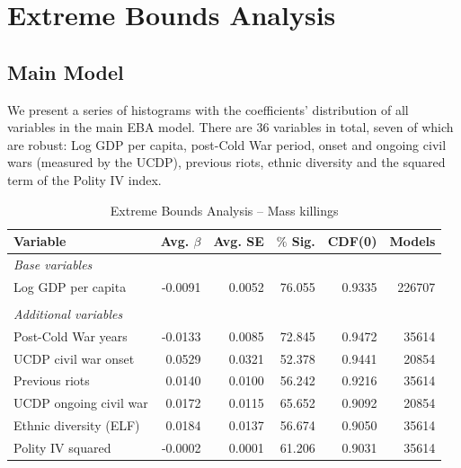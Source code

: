 \documentclass[a4paper,12pt]{article}
\begin{document}
\newpage

\section{Extreme Bounds Analysis}
\label{sec:mk-ebae}

\subsection{Main Model}

We present a series of histograms with the coefficients' distribution of all variables in the main EBA model. There are 36 variables in total, seven of which are robust: Log GDP per capita, post-Cold War period, onset and ongoing civil wars (measured by the UCDP), previous riots, ethnic diversity and the squared term of the Polity IV index.

\vspace{1cm}

\begin{table}[H]
\centering
\begin{tabular}{lrrrrr}
\hline
\textbf{Variable} & \textbf{Avg. $\beta$} & \textbf{Avg. SE} & \textbf{$\%$ Sig.} & \textbf{CDF(0)} & \textbf{Models} \\ \hline
\textit{Base variables} &  &  &  &  &  \\
Log GDP per capita & -0.0091 & 0.0052 & 76.055 & 0.9335 & 226707 \\
 &  &  &  &  &  \\
\textit{Additional variables} &  &  &  &  &  \\
Post-Cold War years & -0.0133 & 0.0085 & 72.845 & 0.9472 & 35614 \\
UCDP civil war onset & 0.0529 & 0.0321 & 52.378 & 0.9441 & 20854 \\
Previous riots & 0.0140 & 0.0100 & 56.242 & 0.9216 & 35614 \\
UCDP ongoing civil war & 0.0172 & 0.0115 & 65.652 & 0.9092 & 20854 \\
Ethnic diversity (ELF) & 0.0184 & 0.0137 & 56.674 & 0.9050 & 35614 \\
Polity IV squared & -0.0002 & 0.0001 & 61.206 & 0.9031 & 35614 \\ \hline
\end{tabular}
\caption{Extreme Bounds Analysis -- Mass killings}
\label{tab:mk}
\end{table}
\end{document}
